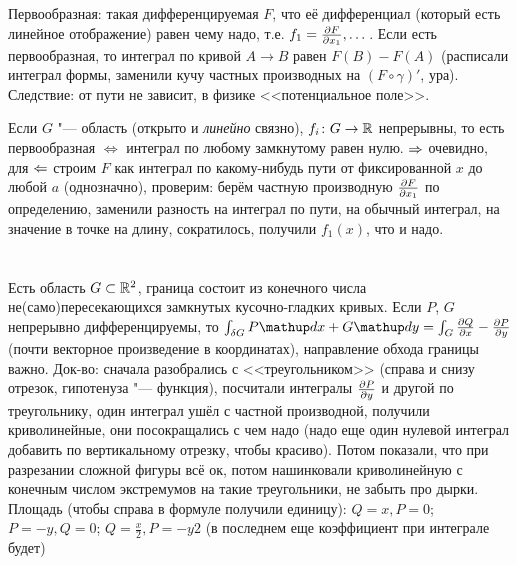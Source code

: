 \section{} %
Первообразная: такая дифференцируемая $F$, что её дифференциал (который есть линейное отображение) равен чему надо,
т.е. $f_1=\frac{\partial F}{\partial x_1}, \dots$.
Если есть первообразная, то интеграл по кривой $A \to B$ равен $F(B)-F(A)$
(расписали интеграл формы, заменили кучу частных производных на $(F \circ \gamma)'$, ура).
Следствие: от пути не зависит, в физике <<потенциальное поле>>.

Если $G$ "--- область (открыто и \textit{линейно} связно), $f_i \colon G \to \mathbb{R}$ непрерывны, то есть первообразная $\iff$ интеграл по любому замкнутому равен нулю.
$\Rightarrow$ очевидно, для $\Leftarrow$ строим $F$ как интеграл по какому-нибудь пути от фиксированной $x$ до любой $a$ (однозначно), проверим: берём частную производную $\frac{\partial F}{\partial x_1}$ по определению,
заменили разность на интеграл по пути, на обычный интеграл, на значение в точке на длину, сократилось, получили $f_1(x)$, что и надо.

\section{} %
Есть область $G \subset \mathbb{R}^2$, граница состоит из конечного числа не(само)пересекающихся замкнутых кусочно-гладких кривых.
Если $P$, $G$ непрерывно дифференцируемы, то $\int_{\delta G} P\d x + G\d y = \int_G \partd{Q}{x}-\partd{P}{y}$ (почти векторное произведение в координатах),
направление обхода границы важно.
Док-во: сначала разобрались с <<треугольником>> (справа и снизу отрезок, гипотенуза "--- функция), посчитали интегралы $\frac{\partial P}{\partial y}$ и другой по треугольнику,
один интеграл ушёл с частной производной, получили криволинейные, они посокращались с чем надо (надо еще один нулевой интеграл добавить по вертикальному отрезку, чтобы красиво).
Потом показали, что при разрезании сложной фигуры всё ок, потом нашинковали криволинейную с конечным числом экстремумов на такие треугольники, не забыть про дырки.
Площадь (чтобы справа в формуле получили единицу): $Q=x, P=0$; $P=-y, Q=0$; $Q=\frac x 2, P=-y 2$ (в последнем еще коэффициент при интеграле будет)
